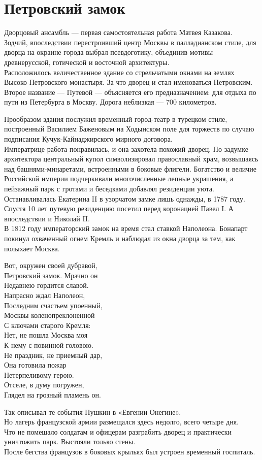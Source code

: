 \documentclass{article}
\begin{document}
\overfullrule=5pt

\section{Петровский замок}
Дворцовый ансамбль — первая самостоятельная работа Матвея Казакова.\\
Зодчий, впоследствии перестроивший центр Москвы в палладианском стиле,
для дворца на окраине города выбрал псевдоготику, объединив мотивы древнерусской,
готической и восточной архитектуры.\\
 Расположилось величественное здание со стрельчатыми окнами на землях Высоко-Петровского монастыря. За что дворец и стал именоваться Петровским. Второе название — Путевой — объясняется его предназначением: для отдыха по пути из Петербурга в Москву. Дорога неблизкая — 700 километров.
 
Прообразом здания послужил временный город-театр в турецком стиле, построенный Василием Баженовым на Ходынском поле для торжеств по случаю подписания Кучук-Кайнаджирского мирного договора.\\
 Императрице работа понравилась, и она захотела похожий дворец. По задумке архитектора центральный купол символизировал православный храм, возвышаясь над башнями-минаретами, встроенными в боковые флигели. Богатство и величие Российской империи подчеркивали многочисленные лепные украшения, а пейзажный парк с гротами и беседками добавлял резиденции уюта.
Останавливалась Екатерина II в узорчатом замке лишь однажды, в 1787 году.\\
Спустя 10 лет путевую резиденцию посетил перед коронацией Павел I. А впоследствии и Николай II.\\
В 1812 году императорский замок на время стал ставкой Наполеона. Бонапарт покинул охваченный огнем Кремль и наблюдал из окна дворца за тем, как полыхает Москва.

Вот, окружен своей дубравой,\\
Петровский замок. Мрачно он\\ 
Недавнею гордится славой.\\
Напрасно ждал Наполеон,\\
Последним счастьем упоенный,\\
Москвы коленопреклоненной\\
С ключами старого Кремля:\\
Нет, не пошла Москва моя\\
К нему с повинной головою.\\
Не праздник, не приемный дар,\\
Она готовила пожар\\
Нетерпеливому герою.\\
Отселе, в думу погружен,\\
Глядел на грозный пламень он.

Так описывал те события Пушкин в «Евгении Онегине».\\
Но лагерь французской армии размещался здесь недолго, всего четыре дня.\\
Что не помешало солдатам и офицерам разграбить дворец и практически уничтожить парк. Выстояли только стены.\\
После бегства французов в боковых крыльях был устроен временный госпиталь.
\end{document}
